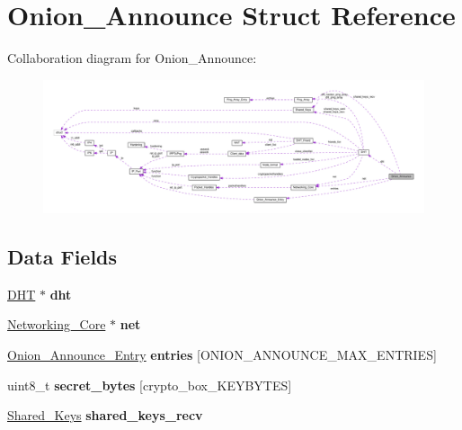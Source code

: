 \hypertarget{struct_onion___announce}{\section{Onion\+\_\+\+Announce Struct Reference}
\label{struct_onion___announce}
}


Collaboration diagram for Onion\+\_\+\+Announce\+:
\nopagebreak
\begin{figure}[H]
\begin{center}
\leavevmode
\includegraphics[width=350pt]{struct_onion___announce__coll__graph}
\end{center}
\end{figure}
\subsection*{Data Fields}
\begin{DoxyCompactItemize}
\item 
\hypertarget{struct_onion___announce_a8b3d6ce8745acc52695e252bdb1531b6}{\hyperlink{struct_d_h_t}{D\+H\+T} $\ast$ {\bfseries dht}}\label{struct_onion___announce_a8b3d6ce8745acc52695e252bdb1531b6}

\item 
\hypertarget{struct_onion___announce_aa14ea2f67950f57fe4235d7375a2216c}{\hyperlink{struct_networking___core}{Networking\+\_\+\+Core} $\ast$ {\bfseries net}}\label{struct_onion___announce_aa14ea2f67950f57fe4235d7375a2216c}

\item 
\hypertarget{struct_onion___announce_a2de468d0c9db89713f12f2e7bd984023}{\hyperlink{struct_onion___announce___entry}{Onion\+\_\+\+Announce\+\_\+\+Entry} {\bfseries entries} \mbox{[}O\+N\+I\+O\+N\+\_\+\+A\+N\+N\+O\+U\+N\+C\+E\+\_\+\+M\+A\+X\+\_\+\+E\+N\+T\+R\+I\+E\+S\mbox{]}}\label{struct_onion___announce_a2de468d0c9db89713f12f2e7bd984023}

\item 
\hypertarget{struct_onion___announce_ad4bfea97df71f88d6de4cbf53f301928}{uint8\+\_\+t {\bfseries secret\+\_\+bytes} \mbox{[}crypto\+\_\+box\+\_\+\+K\+E\+Y\+B\+Y\+T\+E\+S\mbox{]}}\label{struct_onion___announce_ad4bfea97df71f88d6de4cbf53f301928}

\item 
\hypertarget{struct_onion___announce_a4c647e235c4b9d2d6d68d760c7cb1b30}{\hyperlink{struct_shared___keys}{Shared\+\_\+\+Keys} {\bfseries shared\+\_\+keys\+\_\+recv}}\label{struct_onion___announce_a4c647e235c4b9d2d6d68d760c7cb1b30}

\end{DoxyCompactItemize}


